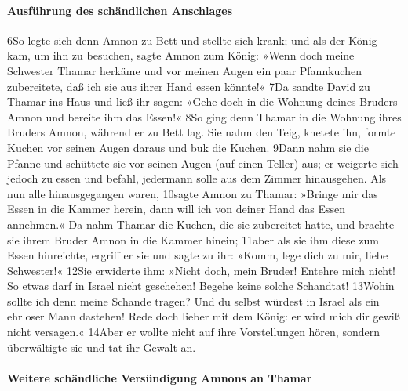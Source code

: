 \hypertarget{ausfuxfchrung-des-schuxe4ndlichen-anschlages}{%
\paragraph{Ausführung des schändlichen
Anschlages}\label{ausfuxfchrung-des-schuxe4ndlichen-anschlages}}

6So legte sich denn Amnon zu Bett und stellte sich krank; und als der
König kam, um ihn zu besuchen, sagte Amnon zum König: »Wenn doch meine
Schwester Thamar herkäme und vor meinen Augen ein paar Pfannkuchen
zubereitete, daß ich sie aus ihrer Hand essen könnte!« 7Da sandte David
zu Thamar ins Haus und ließ ihr sagen: »Gehe doch in die Wohnung deines
Bruders Amnon und bereite ihm das Essen!« 8So ging denn Thamar in die
Wohnung ihres Bruders Amnon, während er zu Bett lag. Sie nahm den Teig,
knetete ihn, formte Kuchen vor seinen Augen daraus und buk die Kuchen.
9Dann nahm sie die Pfanne und schüttete sie vor seinen Augen (auf einen
Teller) aus; er weigerte sich jedoch zu essen und befahl, jedermann
solle aus dem Zimmer hinausgehen. Als nun alle hinausgegangen waren,
10sagte Amnon zu Thamar: »Bringe mir das Essen in die Kammer herein,
dann will ich von deiner Hand das Essen annehmen.« Da nahm Thamar die
Kuchen, die sie zubereitet hatte, und brachte sie ihrem Bruder Amnon in
die Kammer hinein; 11aber als sie ihm diese zum Essen hinreichte,
ergriff er sie und sagte zu ihr: »Komm, lege dich zu mir, liebe
Schwester!« 12Sie erwiderte ihm: »Nicht doch, mein Bruder! Entehre mich
nicht! So etwas darf in Israel nicht geschehen! Begehe keine solche
Schandtat! 13Wohin sollte ich denn meine Schande tragen? Und du selbst
würdest in Israel als ein ehrloser Mann dastehen! Rede doch lieber mit
dem König: er wird mich dir gewiß nicht versagen.« 14Aber er wollte
nicht auf ihre Vorstellungen hören, sondern überwältigte sie und tat ihr
Gewalt an.

\hypertarget{weitere-schuxe4ndliche-versuxfcndigung-amnons-an-thamar}{%
\paragraph{Weitere schändliche Versündigung Amnons an
Thamar}\label{weitere-schuxe4ndliche-versuxfcndigung-amnons-an-thamar}}

